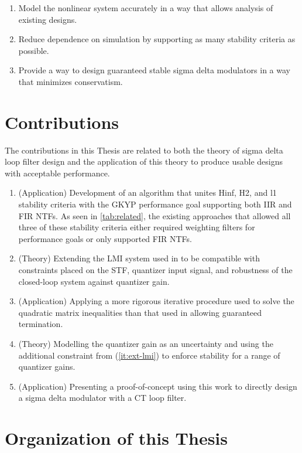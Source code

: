 \begin{enumerate}
	\item Model the nonlinear system accurately in a way that allows analysis of existing designs.
	\item Reduce dependence on simulation by supporting as many stability criteria as possible.
	\item Provide a way to design guaranteed stable sigma delta modulators in a way that minimizes conservatism.
\end{enumerate}

\section{Contributions}
\label{sec:in-contrib}

The contributions in this Thesis are related to both the theory of sigma delta loop filter design and the application of this theory to produce usable designs with acceptable performance.

\begin{enumerate}
	\item (Application) Development of an algorithm that unites \gls{Hinf}, \gls{H2}, and \gls{l1} stability criteria with the \gls{GKYP} performance goal supporting both \gls{IIR} and \gls{FIR} \gls{NTF}s. As seen in \autoref{tab:related}, the existing approaches that allowed all three of these stability criteria either required weighting filters for performance goals or only supported \gls{FIR} \gls{NTF}s.
	\item (Theory) Extending the \gls{LMI} system used in \cite{Li2014} to be compatible with constraints placed on the \gls{STF}, quantizer input signal, and robustness of the closed-loop system against quantizer gain. \label{it:ext-lmi}
	\item (Application) Applying a more rigorous iterative procedure used to solve the quadratic matrix inequalities than that used in \cite{Li2014} allowing guaranteed termination. 
	\item (Theory) Modelling the quantizer gain as an uncertainty and using the additional constraint from (\ref{it:ext-lmi}) to enforce stability for a range of quantizer gains.
	\item (Application) Presenting a proof-of-concept using this work to directly design a sigma delta modulator with a \gls{CT} loop filter.
\end{enumerate}

\section{Organization of this Thesis}
\label{sec:in-org}

